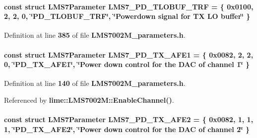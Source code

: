 \paragraph[{L\+M\+S7\+\_\+\+P\+D\+\_\+\+T\+L\+O\+B\+U\+F\+\_\+\+T\+RF}]{\setlength{\rightskip}{0pt plus 5cm}const struct {\bf L\+M\+S7\+Parameter} L\+M\+S7\+\_\+\+P\+D\+\_\+\+T\+L\+O\+B\+U\+F\+\_\+\+T\+RF = \{ 0x0100, 2, 2, 0, \char`\"{}\+P\+D\+\_\+\+T\+L\+O\+B\+U\+F\+\_\+\+T\+R\+F\char`\"{}, \char`\"{}\+Powerdown signal for T\+X L\+O buffer\char`\"{} \}\hspace{0.3cm}{\ttfamily [static]}}\label{LMS7002M__parameters_8h_a2b8a318afc78aec4a932d6f0b755e7de}


Definition at line {\bf 385} of file {\bf L\+M\+S7002\+M\+\_\+parameters.\+h}.

\paragraph[{L\+M\+S7\+\_\+\+P\+D\+\_\+\+T\+X\+\_\+\+A\+F\+E1}]{\setlength{\rightskip}{0pt plus 5cm}const struct {\bf L\+M\+S7\+Parameter} L\+M\+S7\+\_\+\+P\+D\+\_\+\+T\+X\+\_\+\+A\+F\+E1 = \{ 0x0082, 2, 2, 0, \char`\"{}\+P\+D\+\_\+\+T\+X\+\_\+\+A\+F\+E1\char`\"{}, \char`\"{}\+Power down control for the D\+A\+C of channel 1\char`\"{} \}\hspace{0.3cm}{\ttfamily [static]}}\label{LMS7002M__parameters_8h_a9b06336c2b036b3dc4400bc0bb0a857e}


Definition at line {\bf 140} of file {\bf L\+M\+S7002\+M\+\_\+parameters.\+h}.



Referenced by {\bf lime\+::\+L\+M\+S7002\+M\+::\+Enable\+Channel()}.

\paragraph[{L\+M\+S7\+\_\+\+P\+D\+\_\+\+T\+X\+\_\+\+A\+F\+E2}]{\setlength{\rightskip}{0pt plus 5cm}const struct {\bf L\+M\+S7\+Parameter} L\+M\+S7\+\_\+\+P\+D\+\_\+\+T\+X\+\_\+\+A\+F\+E2 = \{ 0x0082, 1, 1, 1, \char`\"{}\+P\+D\+\_\+\+T\+X\+\_\+\+A\+F\+E2\char`\"{}, \char`\"{}\+Power down control for the D\+A\+C of channel 2\char`\"{} \}\hspace{0.3cm}{\ttfamily [static]}}\label{LMS7002M__parameters_8h_a4e3ffd61ee3ae85a0c02a53d4908b721}


